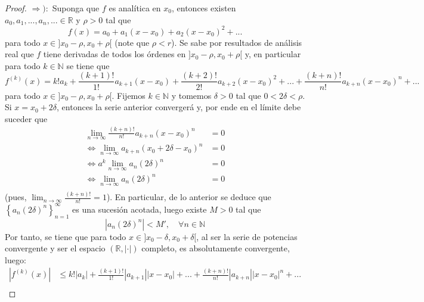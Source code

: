 \documentclass[12pt]{report}
\theoremstyle{largebreak}
\newcommand\abs[1]{\ensuremath{\left|#1\right|}}
\begin{document}
    \begin{proof}
        $\Rightarrow):$ Suponga que $f$ es analítica en $x_0$, entonces existen $a_0,a_1,...,a_n,...\in\mathbb{R}$ y $\rho>0$ tal que
        \begin{equation*}
            f(x)=a_0+a_1(x-x_0)+a_2(x-x_0)^2+...
        \end{equation*}
        para todo $x\in]x_0-\rho,x_0+\rho[$ (note que $\rho<r$). Se sabe por resultados de análisis real que $f$ tiene derivadas de todos los órdenes en $]x_0-\rho,x_0+\rho[$ y, en particular para todo $k\in\mathbb{N}$ se tiene que
        \begin{equation*}
            f^{(k)}(x)=k!a_k+\frac{(k+1)!}{1!}a_{ k+1}(x-x_0)+\frac{(k+2)!}{2!}a_{ k+2}(x-x_0)^2+...+\frac{(k+n)!}{n!}a_{ k+n}(x-x_0)^n+...
        \end{equation*}
        para todo $x\in]x_0-\rho,x_0+\rho[$. Fijemos $k\in\mathbb{N}$ y tomemos $\delta>0$ tal que $0<2\delta<\rho$. Si $x=x_0+2\delta$, entonces la serie anterior convergerá y, por ende en el límite debe suceder que
        \begin{equation*}
            \begin{split}
                \lim_{ n\rightarrow\infty}\frac{(k+n)!}{n!}a_{ k+n}(x-x_0)^n&=0\\
                \iff \lim_{ n\rightarrow\infty}a_{ k+n}(x_0+2\delta-x_0)^n&=0\\
                \iff a^k\lim_{ n\rightarrow\infty}a_{n}(2\delta)^n&=0\\
                \iff \lim_{ n\rightarrow\infty}a_{n}(2\delta)^n&=0\\
            \end{split}
        \end{equation*}
        (pues, $\lim_{ n\rightarrow\infty}\frac{(k+n)!}{n!}=1$). En particular, de lo anterior se deduce que $\left\{a_n(2\delta)^n \right\}_{ n=1}^{\infty}$ es una sucesión acotada, luego existe $M>0$ tal que
        \begin{equation*}
            \abs{a_n(2\delta)^n}<M',\quad\forall n\in\mathbb{N}
        \end{equation*}
        Por tanto, se tiene que para todo $x\in]x_0-\delta,x_0+\delta[$, al ser la serie de potencias convergente y ser el espacio $(\mathbb{R},\abs{\cdot})$ completo, es absolutamente convergente, luego:
        \begin{equation*}
            \begin{split}
                \abs{f^{(k)}(x)}&\leq k!\abs{a_k}+\frac{(k+1)!}{1!}\abs{a_{ k+1}}\abs{x-x_0}+...+\frac{(k+n)!}{n!}\abs{a_{ k+n}}\abs{x-x_0}^n+...\\

\end{split}
\end{equation*}
\end{proof}
\end{document}
